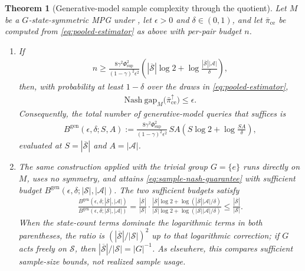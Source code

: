 \documentclass{article}
\theoremstyle{plain}
\newtheorem{theorem}{Theorem}
\theoremstyle{definition}
\theoremstyle{remark}
\newcommand{\Nash}{\mathrm{Nash\ gap}}
\newcommand{\St}{\mathcal{S}}
\newcommand{\Ac}{\mathcal{A}}
\newcommand{\abs}[1]{\left\lvert#1\right\rvert}
\newcommand{\quotient}[1]{\overline{#1}}
\newcommand{\Phisup}{\Phi_{\mathrm{sup}}}
\newcommand{\pice}{\bar\pi_{\mathrm{ce}}}
\begin{document}
\begin{theorem}[Generative-model sample complexity through the quotient]
\label{thm:sample-complexity}
Let $M$ be a $G$-state-symmetric MPG under
, let $\epsilon>0$ and
$\delta\in(0,1)$, and let $\pice$ be computed from
\eqref{eq:pooled-estimator} as above with per-pair budget $n$.
\begin{enumerate}[label=\arabic*.,leftmargin=2.0em,itemsep=2pt,topsep=2pt]
  \item \label{item:sample-complexity-bound}
  If
  \begin{align}
    n
    \ge
    \frac{8\gamma^2\Phisup^2}{(1-\gamma)^2\epsilon^2}
    \left(
      \abs{\quotient\St}\log 2
      +
      \log\frac{\abs{\quotient\St}\abs\Ac}{\delta}
    \right),
    \label{eq:per-pair-budget}
  \end{align}
  then, with probability at least $1-\delta$ over the draws in
  \eqref{eq:pooled-estimator},
  \begin{align}
    \Nash_M\big(\pice^\uparrow\big)
    \le
    \epsilon.
    \label{eq:sample-nash-guarantee}
  \end{align}
  Consequently, the total number of generative-model queries that suffices is
  \begin{align}
    B^{\mathrm{gen}}(\epsilon,\delta;S,A)
    :=
    \frac{8\gamma^2\Phisup^2}{(1-\gamma)^2\epsilon^2}\,
    SA
    \left(
      S\log 2
      +
      \log\frac{SA}{\delta}
    \right),
    \label{eq:total-budget}
  \end{align}
  evaluated at $S=\abs{\quotient\St}$ and $A=\abs\Ac$.

  \item \label{item:sample-complexity-comparison}
  The same construction applied with the trivial group $G=\{e\}$ runs directly
  on $M$, uses no symmetry, and attains \eqref{eq:sample-nash-guarantee} with
  sufficient budget $B^{\mathrm{gen}}(\epsilon,\delta;\abs\St,\abs\Ac)$. The
  two sufficient budgets satisfy
  \begin{align}
    \frac{B^{\mathrm{gen}}(\epsilon,\delta;\abs{\quotient\St},\abs\Ac)}
         {B^{\mathrm{gen}}(\epsilon,\delta;\abs\St,\abs\Ac)}
    =
    \frac{\abs{\quotient\St}}{\abs\St}
    \cdot
    \frac{\abs{\quotient\St}\log2
          +\log(\abs{\quotient\St}\abs\Ac/\delta)}
         {\abs\St\log2
          +\log(\abs\St\abs\Ac/\delta)}
    \le
    \frac{\abs{\quotient\St}}{\abs\St}.
    \label{eq:sample-ratio}
  \end{align}
  When the state-count terms dominate the logarithmic terms in both
  parentheses, the ratio is $(\abs{\quotient\St}/\abs\St)^2$ up to that
  logarithmic correction; if $G$ acts freely on $\St$, then
  $\abs{\quotient\St}/\abs\St=\abs G^{-1}$. As elsewhere, this compares
  sufficient sample-size bounds, not realized sample usage.
\end{enumerate}
\end{theorem}
\end{document}
